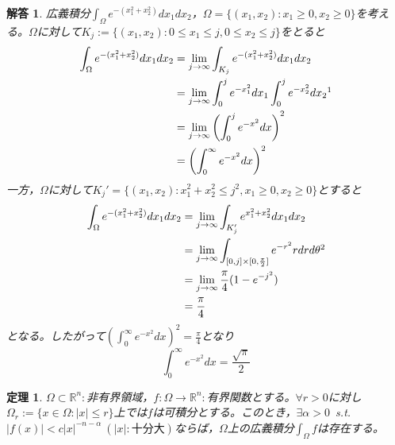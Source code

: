 \documentclass[dvipdfmx,a4j,10pt]{jsarticle}
\theoremstyle{mystyle1}
\newtheorem{thm}[dfn]{定理}
\theoremstyle{mystyle2}
\newtheorem{ans}{解答}
\begin{document}
\begin{ans}
	広義積分$\displaystyle\int_\Omega e^{-(x_1^2+x_2^2)}dx_1dx_2$，$\Omega=\{(x_1,x_2):x_1\geq 0,x_2\geq 0\}$を考える。$\Omega$に対して$K_j:=\{(x_1,x_2):0\leq x_1\leq j,0\leq x_2\leq j\}$をとると
	\[
	\begin{split}
		\int_\Omega e^{-(x_1^2+x_2^2)}dx_1dx_2
		&= \lim_{j\to\infty}\int_{K_j} e^{-(x_1^2+x_2^2)}dx_1dx_2 \\
		&= \lim_{j\to\infty}\int_0^j e^{-x_1^2}dx_1 \int_0^j e^{-x_2^2}dx_2 \footnotemark\\
		&=\lim_{j\to\infty}\left(\int_0^j e^{-x^2}dx\right)^2 \\
		&=\left(\int_0^\infty e^{-x^2} dx\right)^2
	\end{split}
	\]
	一方，$\Omega$に対して$K_j'=\{(x_1,x_2):x_1^2+x_2^2\leq j^2,x_1\geq 0,x_2\geq 0\}$とすると
	\[
		\begin{split}
		\int_\Omega e^{-(x_1^2+x_2^2)}dx_1dx_2
		&=\lim_{j\to\infty}\int_{K_j'} e^{x_1^2+x_2^2}dx_1dx_2 \\
		&=\lim_{j\to\infty}\int_{[0,j]\times[0,\frac{\pi}{2}]}e^{-r^2}rdrd\theta\footnotemark\\
		&= \lim_{j\to\infty}\frac{\pi}{4}(1-e^{-j^2})\\
		&=\frac{\pi}{4}
		\end{split}
	\]
	となる。したがって$\displaystyle\left(\int_0^\infty e^{-x^2} dx\right)^2= \frac{\pi}{4}$となり
	\[
		\int_0^\infty e^{-x^2}dx=\frac{\sqrt{\pi}}{2}
	\]
\end{ans}

\begin{framed}
	\begin{thm}
		$\Omega\subset\mathbb{R}^n:$非有界領域，$f:\Omega\to\mathbb{R}^n:$有界関数とする。$\forall r>0$に対し$\Omega_r:=\{x\in\Omega:|x|\leq r\}$上では$f$は可積分とする。このとき，$\exists\alpha>0$\ s.t.\ $|f(x)|<c|x|^{-n-\alpha}\ (|x|:十分大)$ならば，$\Omega$上の広義積分$\displaystyle\int_\Omega f$は存在する。
	\end{thm}
\end{framed}
\end{document}
